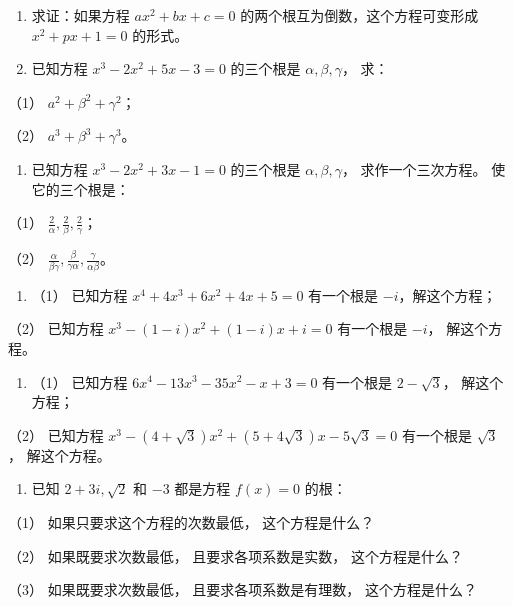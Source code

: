 \begin{enumerate}[start=7]
\item
  求证：如果方程 \(ax^2 + bx + c = 0\)
  的两个根互为倒数，这个方程可变形成 \(x^2 + px + 1 = 0\) 的形式。
\item
  已知方程 \(x^3-2x^2+5x-3=0\) 的三个根是 \(\alpha, \beta, \gamma\)，
  求：
\end{enumerate}

（1） \(a^2 + \beta^2 + \gamma^2\)；

（2） \(a^3 + \beta^3 + \gamma^3\)。

\begin{enumerate}[start=9]
\item
  已知方程 \(x^{3} - 2x^{2} + 3x - 1 = 0\) 的三个根是
  \(\alpha, \beta, \gamma\)， 求作一个三次方程。 使它的三个根是：
\end{enumerate}

（1） \(\frac{2}{\alpha}, \frac{2}{\beta}, \frac{2}{\gamma}\)；

（2）
\(\frac{\alpha}{\beta \gamma}, \frac{\beta}{\gamma \alpha}, \frac{\gamma}{\alpha \beta}\)。

\begin{enumerate}[start=10]
\item
  （1） 已知方程 \(x^{4} + 4x^{3} + 6x^{2} + 4x + 5 = 0\) 有一个根是
  \(-i\)，解这个方程；
\end{enumerate}

（2） 已知方程 \(x^{3} - (1 - i)x^{2} + (1 - i)x + i = 0\) 有一个根是
\(-i\)， 解这个方程。

\begin{enumerate}[start=11]
\item
  （1） 已知方程 \(6x^{4} - 13x^{3} - 35x^{2} - x + 3 = 0\) 有一个根是
  \(2 - \sqrt{3}\)， 解这个方程；
\end{enumerate}

（2） 已知方程
\(x^{3} - (4 + \sqrt{3})x^{2} + (5 + 4\sqrt{3})x - 5\sqrt{3} = 0\)
有一个根是 \(\sqrt{3}\)， 解这个方程。

\begin{enumerate}[start=12]
\item
  已知 \(2 + 3i, \sqrt{2}\) 和 \(-3\) 都是方程 \(f(x) = 0\) 的根：
\end{enumerate}

（1） 如果只要求这个方程的次数最低， 这个方程是什么？

（2） 如果既要求次数最低， 且要求各项系数是实数， 这个方程是什么？

（3） 如果既要求次数最低， 且要求各项系数是有理数， 这个方程是什么？

